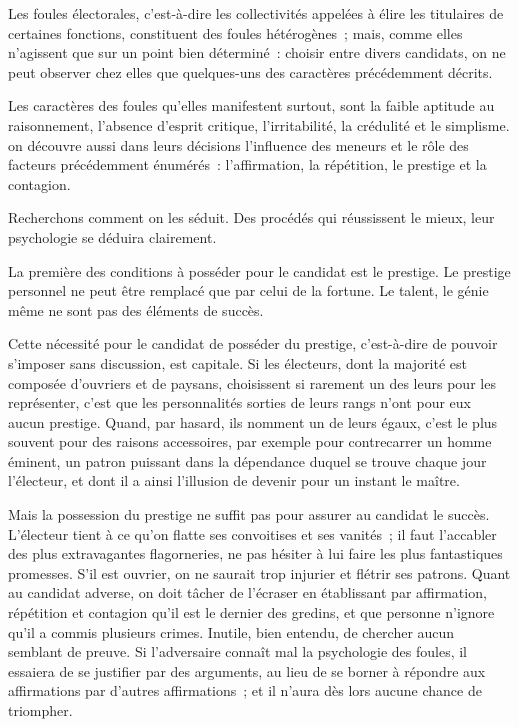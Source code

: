 \documentclass[french,twoside]{book} %
\begin{document}
\noindent Les foules électorales, c’est-à-dire les collectivités appelées à élire les titulaires de certaines fonctions, constituent des foules hétérogènes ; mais, comme elles n’agissent que sur un point bien déterminé : choisir entre divers candidats, on ne peut observer chez elles que quelques-uns des caractères précédemment décrits.\par
Les caractères des foules qu’elles manifestent surtout, sont la faible aptitude au raisonnement, l’absence d’esprit critique, l’irritabilité, la crédulité et le simplisme. on découvre aussi dans leurs décisions l’influence des meneurs et le rôle des facteurs précédemment énumérés : l’affirmation, la répétition, le prestige et la contagion.\par
Recherchons comment on les séduit. Des procédés qui réussissent le mieux, leur psychologie se déduira clairement.\par
La première des conditions à posséder pour le candidat est le prestige. Le prestige personnel ne peut être remplacé que par celui de la fortune. Le talent, le génie même ne sont pas des éléments de succès.\par
Cette nécessité pour le candidat de posséder du pres­tige, c’est-à-dire de pouvoir s’imposer sans discussion, est capitale. Si les électeurs, dont la majorité est composée d’ouvriers et de paysans, choisissent si rarement un des leurs pour les représenter, c’est que les personnalités sorties de leurs rangs n’ont pour eux aucun prestige. Quand, par hasard, ils nomment un de leurs égaux, c’est le plus souvent pour des raisons accessoires, par exemple pour contrecarrer un homme éminent, un patron puissant dans la dépendance duquel se trouve chaque jour l’électeur, et dont il a ainsi l’illusion de devenir pour un instant le maître.\par
Mais la possession du prestige ne suffit pas pour assurer au candidat le succès. L’électeur tient à ce qu’on flatte ses convoitises et ses vanités ; il faut l’accabler des plus extravagantes flagorneries, ne pas hésiter à lui faire les plus fantastiques promes­ses. S’il est ouvrier, on ne saurait trop injurier et flétrir ses patrons. Quant au candidat adverse, on doit tâcher de l’écraser en établissant par affirmation, répétition et conta­gion qu’il est le dernier des gredins, et que personne n’ignore qu’il a commis plusieurs crimes. Inutile, bien entendu, de chercher aucun semblant de preuve. Si l’adversaire connaît mal la psychologie des foules, il essaiera de se justifier par des arguments, au lieu de se borner à répondre aux affirmations par d’autres affirmations ; et il n’aura dès lors aucune chance de triompher.\par
\end{document}
